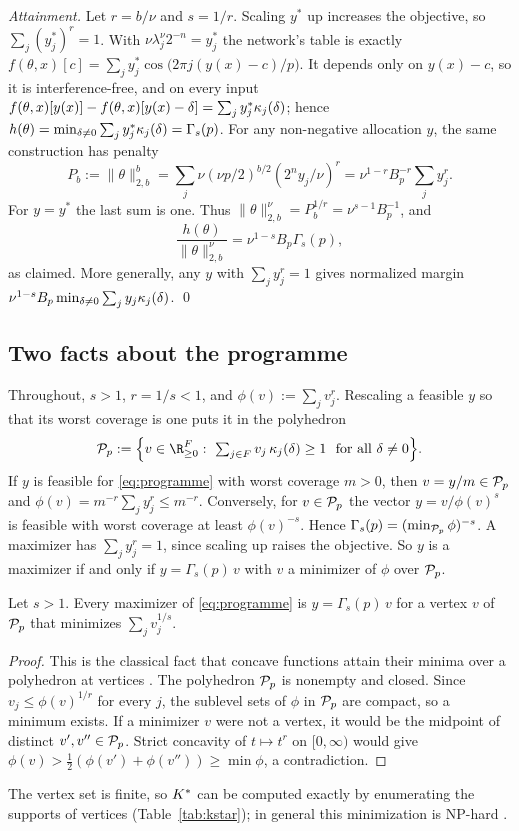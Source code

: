 \emph{Attainment.} Let $r=b/\nu$ and $s=1/r$. Scaling $y^*$ up increases the objective, so $\sum_j(y^*_j)^r=1$. With $\nu\lambda_j^\nu2^{-n}=y^*_j$ the network's table is exactly
$f(\theta,x)[c]=\sum_jy^*_j\cos\big(2\pi j(y(x)-c)/p\big)$. It depends only on $y(x)-c$, so it is interference-free, and on every input $f(\theta,x)[y(x)]-f(\theta,x)[y(x)-\delta]=\sum_jy^*_j\kappa_{j}(\delta)$; hence $h(\theta)=\min_{\delta\neq0}\sum_jy^*_j\kappa_{j}(\delta)=\Gamma_s(p)$. For any non-negative allocation $y$, the same construction has penalty
\[
P_b:=\|\theta\|_{2,b}^b
=\sum_j\nu(\nu p/2)^{b/2}(2^ny_j/\nu)^r
=\nu^{1-r}B_p^{-r}\sum_jy_j^r.
\]
For $y=y^*$ the last sum is one. Thus $\|\theta\|_{2,b}^\nu=P_b^{1/r}=\nu^{s-1}B_p^{-1}$, and
\[
\frac{h(\theta)}{\|\theta\|_{2,b}^\nu}
=\nu^{1-s}B_p\Gamma_s(p),
\]
as claimed. More generally, any $y$ with $\sum_jy_j^r=1$ gives normalized margin $\nu^{1-s}B_p\min_{\delta\neq0}\sum_jy_j\kappa_{j}(\delta)$.
\qed

\subsection{Two facts about the programme}\label{app:shape}

Throughout, $s>1$, $r=1/s<1$, and $\phi(v):=\sum_jv_j^r$. Rescaling a feasible $y$ so that its worst coverage is one puts it in the polyhedron
\[
\curlyp_p:=\Big\{v\in\R_{\ge0}^{\Fp}:\ \textstyle\sum_{j\in\Fp}v_j\,\cov{j}{\delta}\ge1\ \text{ for all }\delta\neq0\Big\}.
\]
If $y$ is feasible for \eqref{eq:programme} with worst coverage $m>0$, then $v=y/m\in\mathcal{P}_p$ and $\phi(v)=m^{-r}\sum_jy_j^r\le m^{-r}$. Conversely, for $v\in\mathcal{P}_p$ the vector $y=v/\phi(v)^s$ is feasible with worst coverage at least $\phi(v)^{-s}$. Hence $\Gamma_s(p)=(\min_{\mathcal{P}_p}\phi)^{-s}$. A maximizer has $\sum_jy_j^r=1$, since scaling up raises the objective. So $y$ is a maximizer if and only if $y=\Gamma_s(p)\,v$ with $v$ a minimizer of $\phi$ over $\mathcal{P}_p$.

\begin{lemma}\label{lem:vertex}
Let $s>1$. Every maximizer of \eqref{eq:programme} is $y=\Gamma_s(p)\,v$ for a vertex $v$ of $\mathcal{P}_p$ that minimizes $\sum_jv_j^{1/s}$.
\end{lemma}
\begin{proof}
This is the classical fact that concave functions attain their minima over a polyhedron at vertices \citep[\S32]{hirsch1961extreme,rockafellar1970convex}. The polyhedron $\mathcal{P}_p$ is nonempty and closed. Since $v_j\le\phi(v)^{1/r}$ for every $j$, the sublevel sets of $\phi$ in $\mathcal{P}_p$ are compact, so a minimum exists. If a minimizer $v$ were not a vertex, it would be the midpoint of distinct $v',v''\in\mathcal{P}_p$. Strict concavity of $t\mapsto t^r$ on $[0,\infty)$ would give $\phi(v)>\frac12(\phi(v')+\phi(v''))\ge\min\phi$, a contradiction.
\end{proof}
The vertex set is finite, so $K^{*}$ can be computed exactly by enumerating the supports of vertices (Table~\ref{tab:kstar}); in general this minimization is NP-hard \citep{ge2011note}.

